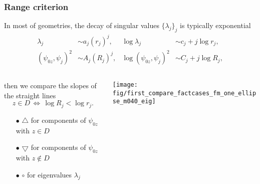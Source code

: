 \documentclass[10pt,xcolor={dvipsnames}]{beamer}
\theoremstyle{plain}
\theoremstyle{plain}
\begin{document}
\begin{frame}
\frametitle{Range criterion}
In most of geometries, the decay of singular values $\bigl\{\lambda_j\bigr\}_j$ is typically exponential
\begin{align}
 \lambda_j &\sim a_j (r_j) ^j,  & \log\lambda_j &\sim c_j + j\log r_j,\label{eq:straightline-eig}\\
 (\psi_{0z}, \psi_j)^2 &\sim A_j(R_j)^j, & \log(\psi_{0z}, \psi_j)^2 &\sim C_j + j\log R_j\label{eq:straightline-data},
\end{align}
\vspace{0.1cm}
\begin{columns}[T]
\begin{column}{0.42\textwidth}
\vspace{0.1cm}
then we compare the slopes of the straight lines
\begin{equation*}
 z\in D \,\Longleftrightarrow\,
 \log R_j < \log r_j.
\end{equation*}
{
\scriptsize
\begin{itemize}
 \item[$\bullet$] $\bigtriangleup$ for components of $\psi_{0z}$ with $z\in D$
 \item[$\bullet$] $\bigtriangledown$ for components of $\psi_{0z}$ with $z\notin D$
 \item[$\bullet$] $\circ$ for eigenvalues $\lambda_j$
\end{itemize}
}
\end{column}
\begin{column}{0.6\textwidth}
\centering
\texttt{[image: fig/first\_compare\_factcases\_fm\_one\_ellipse\_m040\_eig]}
\end{column}
\end{columns}
\end{frame}
\end{document}
